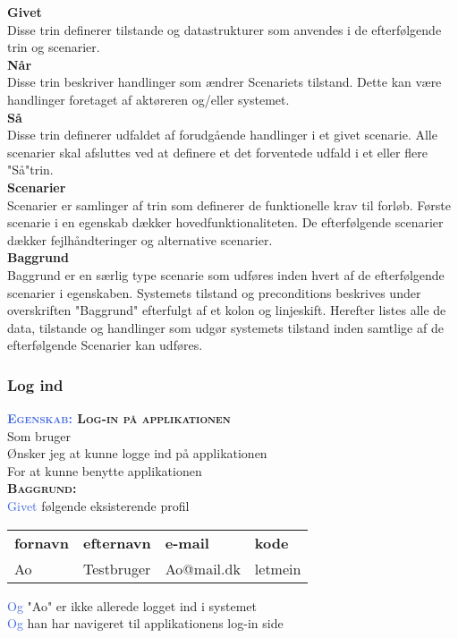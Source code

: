 \large{\textbf{Givet}}\\
Disse trin definerer tilstande og datastrukturer som anvendes i de 
efterfølgende trin og scenarier.\\
\large{\textbf{Når}}\\
Disse trin beskriver handlinger som ændrer Scenariets tilstand. Dette kan 
være handlinger	foretaget af aktøreren og/eller systemet.\\
\large{\textbf{Så}}\\
Disse trin definerer udfaldet af forudgående handlinger i et givet 
scenarie. Alle scenarier skal afsluttes ved at definere et det forventede 
udfald i et eller flere "Så"trin.\\
\large{\textbf{Scenarier}}\\
Scenarier er samlinger af trin som definerer de funktionelle krav til 
forløb. Første scenarie i en egenskab dækker hovedfunktionaliteten. De 
efterfølgende scenarier dækker fejlhåndteringer og alternative scenarier.\\
\large{\textbf{Baggrund}}\\
Baggrund er en særlig type scenarie som udføres inden hvert af de 
efterfølgende scenarier	i egenskaben. Systemets tilstand og preconditions 
beskrives under overskriften "Baggrund" efterfulgt af et kolon og 
linjeskift. Herefter listes alle de data, tilstande og handlinger som udgør 
systemets tilstand inden samtlige af de efterfølgende Scenarier kan	udføres.


\subsubsection{Log ind}
\textbf{\textsc{\textcolor{RoyalBlue} {Egenskab:} Log-in på applikationen}} \\
Som bruger\\
Ønsker jeg at kunne logge ind på applikationen\\
For at kunne benytte applikationen\\

\textbf{\textsc{\color{RoyalBlue}Baggrund:}}\\
\textcolor{RoyalBlue}{Givet} følgende eksisterende profil\\
\begin{tabular}{| l | l | l | l |}
	\textbf{fornavn} & \textbf{efternavn} & \textbf{e-mail} & \textbf{kode} \\
	Ao & Testbruger & Ao@mail.dk & letmein\\
\end{tabular}
\newline \newline
\textcolor{RoyalBlue}{Og} "Ao" er ikke allerede logget ind i systemet\\
\textcolor{RoyalBlue}{Og} han har navigeret til applikationens log-in side\\

